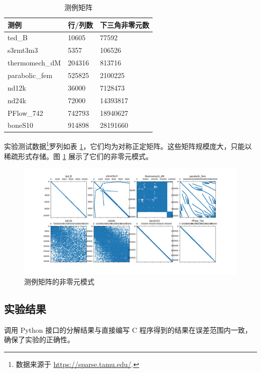 \begin{table}
  \centering
  \caption{测例矩阵}
  \begin{tabular}{lll}
    \toprule
     测例           &  行/列数  &  下三角非零元数 \\
    \midrule
     ted\_B          &  10605    &  77592          \\
     s3rmt3m3       &  5357     &  106526         \\
     thermomech\_dM  &  204316   &  813716         \\
     parabolic\_fem  &  525825   &  2100225        \\
     nd12k          &  36000    &  7128473        \\
     nd24k          &  72000    &  14393817       \\
     PFlow\_742      &  742793   &  18940627       \\
     boneS10        &  914898   &  28191660       \\
    \bottomrule
  \end{tabular}
  \label{tab:4.1}
\end{table}


实验测试数据\footnote{数据来源于 \url{https://sparse.tamu.edu/}.}罗列如表 \ref{tab:4.1}，它们均为对称正定矩阵。这些矩阵规模庞大，只能以稀疏形式存储。图 \ref{fig:4.3} 展示了它们的非零元模式。


\begin{figure}
  \centering
  \includegraphics[width=\linewidth]{figures/测例矩阵.png}
  \caption{测例矩阵的非零元模式}
  \label{fig:4.3}
\end{figure}

\subsection{实验结果}

调用 Python 接口的分解结果与直接编写 C 程序得到的结果在误差范围内一致，确保了实验的正确性。

